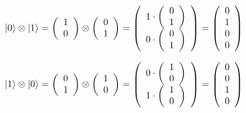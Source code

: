 \begin{align} %
  \ket{0}\otimes\ket{1} &=
  \left(
    \begin{array}{c}
      1\\
      0
    \end{array}
  \right)
  \otimes
  \left(
    \begin{array}{c}
      0\\
      1
    \end{array}
  \right)
  =
  \left(
  \begin{array}{c}
    1 \cdot \left(
              \begin{array}{c}
                0\\
                1
              \end{array}
            \right)\\
    0 \cdot \left(
              \begin{array}{c}
                0\\
                1
              \end{array}
            \right)\\
    \end{array}
  \right)
  =
  \left(
    \begin{array}{c}
      0\\
      1\\
      0\\
      0
    \end{array}
  \right)
\end{align}

\begin{align} %
  \ket{1}\otimes\ket{0} &=
  \left(
    \begin{array}{c}
      0\\
      1
    \end{array}
  \right)
  \otimes
  \left(
    \begin{array}{c}
      1\\
      0
    \end{array}
  \right)
  =
  \left(
  \begin{array}{c}
    0 \cdot \left(
              \begin{array}{c}
                1\\
                0
              \end{array}
            \right)\\
    1 \cdot \left(
              \begin{array}{c}
                1\\
                0
              \end{array}
            \right)\\
    \end{array}
  \right)
  =
  \left(
    \begin{array}{c}
      0\\
      0\\
      1\\
      0
    \end{array}
  \right)
\end{align}

